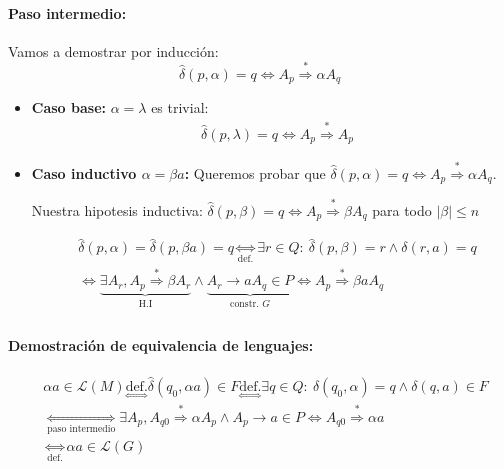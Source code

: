 \paragraph{Paso intermedio:} Vamos a demostrar por inducción: \[ \hat\delta(p,\alpha) = q \iff A_p \overset{*}{\Rightarrow} \alpha A_q\]

\begin{itemize}
  \item \textbf{Caso base:} \(\alpha = \lambda\) es trivial:
        \begin{align*}
           & \hat\delta(p,\lambda) = q \iff A_p \overset{*}{\Rightarrow} A_p
        \end{align*}
  \item \textbf{Caso inductivo \(\alpha = \beta a\):} Queremos probar que \(\hat\delta(p,\alpha) = q \iff A_p \overset{*}{\Rightarrow} \alpha A_q\).

        Nuestra hipotesis inductiva: \(\hat\delta(p,\beta) = q \iff A_p \overset{*}{\Rightarrow} \beta A_q\) para todo \(|\beta| \leq n\)

        \begin{align*}
           & \hat\delta(p, \alpha) = \hat\delta(p, \beta a) = q \underset{\text{def.}}{\iff}\exists r\in Q:~\hat\delta(p,\beta) = r \land \delta(r, a) = q                                                     \\
           & \iff\underbrace{\exists A_r, A_p \overset{*}{\Rightarrow} \beta A_r}_{\text{H.I}} \land \underbrace{A_r \rightarrow a A_q \in P}_{\text{constr. }G} \iff A_p \overset{*}{\Rightarrow} \beta a A_q \\
        \end{align*}
\end{itemize}

\paragraph{Demostración de equivalencia de lenguajes:}
\begin{align*}
   & \alpha a\in\mathcal{L}(M) \underset{\iff}{\text{def.}} \hat\delta(q_0, \alpha a) \in F \underset{\iff}{\text{def.}} \exists q\in Q:~\hat\delta(q_0, \alpha) = q \land \delta(q,a)\in F \\
   & \underset{\text{paso intermedio}}{\iff} \exists A_p, A_{q0} \overset{*}{\Rightarrow} \alpha A_p \land A_p \rightarrow a \in P \iff A_{q0} \overset{*}{\Rightarrow} \alpha a            \\
   & \underset{\text{def.}}{\iff} \alpha a \in\mathcal{L}(G)
\end{align*}

